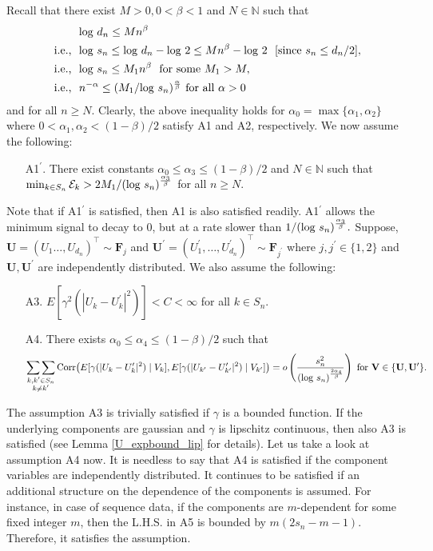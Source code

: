 \documentclass[twoside]{article}
\def\log{\hbox{log}}
\def\Corr{\hbox{Corr}}
\def\Corr{\hbox{Corr}}
\newcommand{\bF}{\mathbf{F}}
\newcommand{\bU}{\mathbf{U}}
\newcommand{\bV}{\mathbf{V}}
\newcommand{\0}{\mathbf{0}}
\newcommand{\1}{\mathbf{1}}
\numberwithin{equation}{section}
\begin{document}
\noindent Recall that there exist $M>0,0<\beta<1$ and $N\in\mathbb{N}$ such that 
\begin{align*}
    &\ \log\ d_n\leq Mn^\beta\\
    \text{i.e., }&\ \log\ s_n \leq \log\ d_n - \log\ 2\leq Mn^\beta- \log\ 2\ \ [\text{since } s_n\leq d_n/2],\\
    \text{i.e., }&\ \log\ s_n \leq M_1n^\beta\ \text{ for some } M_1>M,\\
    \text{i.e., }&\ n^{-\alpha}\leq (M_1/\log\ s_n)^\frac{\alpha}{\beta}\text{ for all }\alpha>0
\end{align*}
and for all $n\geq N.$ Clearly, the above inequality holds for $\alpha_0=\max\{\alpha_1,\alpha_2\}$ where $0<\alpha_1,\alpha_2<(1-\beta)/2$ satisfy A1 and A2, respectively. We now assume the following:
\begin{itemize}
    \item[A1$^\prime$.]  There exist constants $\alpha_0\le \alpha_3\le (1-\beta)/2$ and  $N\in\mathbb{N}$ such that $\min_{k\in S_n}\mathcal{E}_k>2M_1/(\log \ s_n)^{\frac{\alpha_3}{\beta}}$ for all $n\geq N.$
\end{itemize}
Note that if A1$^\prime$ is satisfied, then A1 is also satisfied readily. A1$^\prime$ allows the minimum signal to decay to 0, but at a rate slower than $1/(\log \ s_n)^{\frac{\alpha_3}{\beta}}.$ Suppose, $\bU=(U_1\ldots, U_{d_n})^\top\sim\bF_j$ and $\bU^\prime=(U^\prime_1,\ldots, U^\prime_{d_n})^\top\sim\bF_{j^\prime}$ where $j,j^\prime\in\{1,2\}$ and $\bU,\bU^\prime$ are independently distributed. We also assume the following:
\begin{enumerate}
    \item[A3.]  $E[\gamma^2(|U_{k}-U^\prime_{k}|^2)]<C<\infty$ for all $k\in S_n.$
    \item[A4.] There exists $\alpha_0\le \alpha_4\le (1-\beta)/2$ such that $$\mathop{\sum\sum}\limits_{\substack{k,k^\prime \in S_n\\ k\neq k^\prime}}\Corr{\left(E[\gamma(|U_{k}-U^\prime_{k}|^2)\mid V_{k}],E[\gamma(|U_{k^\prime}-U^\prime_{k^\prime}|^2)\mid V_{k^\prime}]\right )}=o\left (\frac{s_n^2}{\left (\log\ s_n\right )^\frac{2\alpha_4}{\beta}}\right )\text{ for }\bV\in\{\bU,\bU^\prime\}.$$ 
\end{enumerate}
The assumption A3 is trivially satisfied if $\gamma$ is a bounded function. If the underlying components are gaussian and $\gamma$ is lipschitz continuous, then also A3 is satisfied (see Lemma \ref{U_expbound_lip} for details). Let us take a look at assumption A4 now. It is needless to say that A4 is satisfied if the component variables are independently distributed. It continues to be satisfied if an additional structure on the dependence of the components is assumed. For instance, in case of sequence data, if the components are $m$-dependent \citep{billingsley2008probability} for some fixed integer $m$, then the L.H.S. in A5 is bounded by $m(2s_n- m - 1).$ Therefore, it satisfies the assumption.
\end{document}

